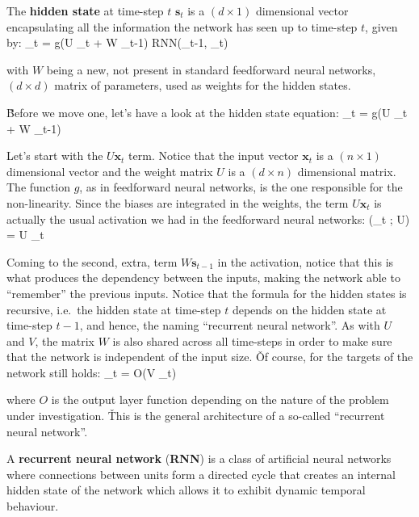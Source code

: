 The \textbf{hidden state} at time-step $t$ $\boldsymbol{s}_{t}$ is a $(d \times 1)$ dimensional vector encapsulating
all the information the network has seen up to time-step $t$, given by:
\bse
{}_{t} = g(U _{t} + W _{t-1}) \coloneqq RNN(_{t-1},
_{t})
\ese

with $W$ being a new, not present in standard feedforward neural networks, $(d \times d)$ matrix of parameters, used as
weights for the hidden states.
\ed


\v

Before we move one, let's have a look at the hidden state equation:
\bse
{}_{t} = g(U _{t} + W _{t-1})
\ese

Let's start with the $U \boldsymbol{x}_{t}$ term. Notice that the input vector $\boldsymbol{x}_{t}$ is a $(n \times 1
)$ dimensional vector and the weight matrix $U$ is a $(d\times n)$ dimensional matrix. The function $g$, as in
feedforward neural networks, is the one responsible for the non-linearity. Since the biases are integrated in the
weights, the term $U \boldsymbol{x}_{t}$ is actually the usual activation we had in the feedforward neural networks:
\bse
{}(_{t} ; U) = U _{t}
\ese

Coming to the second, extra, term $W \boldsymbol{s}_{t-1}$ in the activation, notice that this is what produces the
dependency between the inputs, making the network able to ``remember'' the previous inputs. Notice that the formula
for the hidden states is recursive, i.e.\ the hidden state at time-step $t$ depends on the hidden state at time-step
$t-1$, and hence, the naming ``recurrent neural network''. As with $U$ and $V$, the matrix $W$ is also shared across all
time-steps in order to make sure that the network is independent of the input size. \v

Of course, for the targets of the network still holds:
\bse
{}_t = O(V _{t})
\ese

where $O$ is the output layer function depending on the nature of the problem under investigation. \v

This is the general architecture of a so-called ``recurrent neural network''.

A \textbf{recurrent neural network} (\textbf{RNN}) is a class of artificial neural networks where connections between
units form a directed cycle that creates an internal hidden state of the network which allows it to exhibit dynamic
temporal behaviour.
\ed

